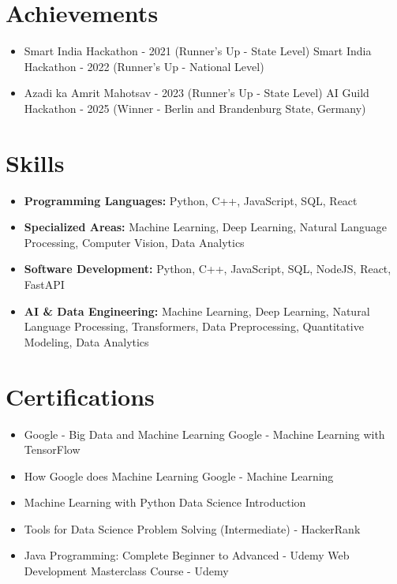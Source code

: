 \documentclass[a4paper,10pt]{article}
\begin{document}
\section*{Achievements}
\begin{itemize}
\item Smart India Hackathon - 2021 (Runner's Up - State Level) \hfill Smart India Hackathon - 2022 (Runner's Up - National Level)
\item Azadi ka Amrit Mahotsav - 2023 (Runner's Up - State Level) \hfill AI Guild Hackathon - 2025 (Winner - Berlin and Brandenburg State, Germany)
\end{itemize}

\section*{Skills}
\begin{itemize}
  \item \textbf{Programming Languages:} Python, C++, JavaScript, SQL, React
  \item \textbf{Specialized Areas:} Machine Learning, Deep Learning, Natural Language Processing, Computer Vision, Data Analytics
  \item \textbf{Software Development:} Python, C++, JavaScript, SQL, NodeJS, React, FastAPI
  \item \textbf{AI \& Data Engineering:} Machine Learning, Deep Learning, Natural Language Processing, Transformers, Data Preprocessing, Quantitative Modeling, Data Analytics
\end{itemize}

\section*{Certifications}
\begin{itemize}
\item Google - Big Data and Machine Learning \hfill Google - Machine Learning with TensorFlow
\item How Google does Machine Learning \hfill Google - Machine Learning
\item Machine Learning with Python \hfill Data Science Introduction
\item Tools for Data Science \hfill Problem Solving (Intermediate) - HackerRank
\item Java Programming: Complete Beginner to Advanced - Udemy \hfill Web Development Masterclass Course - Udemy
\end{itemize}
\end{document}
